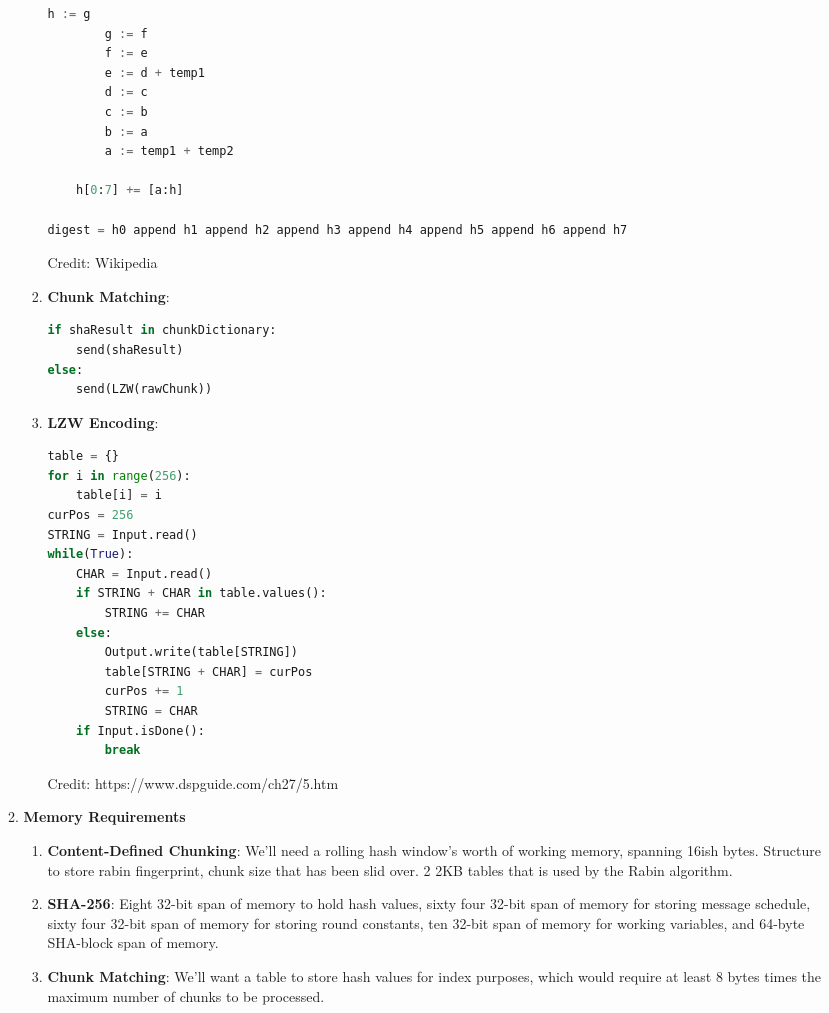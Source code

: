 \documentclass{article}
\begin{document}
\begin{enumerate}
\begin{enumerate}[label=(\alph*)]
\begin{enumerate}[label=(\roman*)]
\begin{lstlisting}[language=python]
        h := g
        g := f
        f := e
        e := d + temp1
        d := c
        c := b
        b := a
        a := temp1 + temp2
    
    h[0:7] += [a:h]
    
digest = h0 append h1 append h2 append h3 append h4 append h5 append h6 append h7

\end{lstlisting}
Credit: Wikipedia
\item%
\textbf{Chunk Matching}:
\begin{lstlisting}[language=python]
if shaResult in chunkDictionary:
    send(shaResult)
else:
    send(LZW(rawChunk))
\end{lstlisting}
\item%
\textbf{LZW Encoding}:
\begin{lstlisting}[language=python]
table = {}
for i in range(256):
    table[i] = i
curPos = 256
STRING = Input.read()
while(True):
    CHAR = Input.read()
    if STRING + CHAR in table.values():
        STRING += CHAR
    else:
        Output.write(table[STRING])
        table[STRING + CHAR] = curPos
        curPos += 1
        STRING = CHAR
    if Input.isDone():
        break
\end{lstlisting}
Credit: https://www.dspguide.com/ch27/5.htm
\end{enumerate}%
\item%
\textbf{Memory Requirements}
\begin{enumerate}[label=(\roman*)]
\item%
\textbf{Content-Defined Chunking}:\newline
We'll need a rolling hash window's worth of working memory, spanning 16ish bytes.
Structure to store rabin fingerprint, chunk size that has been slid over.
2 2KB tables that is used by the Rabin algorithm.
\item%
\textbf{SHA-256}:\newline
Eight 32-bit span of memory to hold hash values, 
sixty four 32-bit span of memory for storing message schedule,
sixty four 32-bit span of memory for storing round constants,
ten 32-bit span of memory for working variables, and
64-byte SHA-block span of memory.

\item%
\textbf{Chunk Matching}:\newline
We'll want a table to store hash values for index purposes, which would require at least 8 bytes times the maximum number of chunks to be processed.


\end{enumerate}
\end{enumerate}
\end{enumerate}
\end{document}
